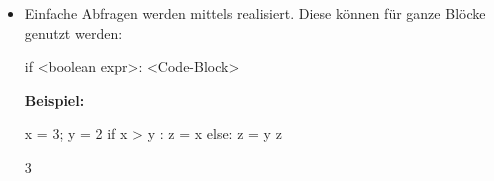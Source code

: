 \documentclass[fontsize=12pt,paper=a4,twoside,bibtotoc,idxtotoc,
liststotoc,pagesize,BCOR1.2cm,DIV15,chapterprefix,pagesize=pdftex]{scrbook}
\begin{document}
\begin{itemize}
\begin{sage}
(12, 16777216)
\end{sage}
\textbf{Wichtig:} In Python/Sage ist solch ein Code-Block dadurch gekennzeichnet, dass er mit einem \textbf{:} eingeleitet wird und um ein TAB eingerückt ist!
\item Einfache Abfragen werden mittels  realisiert. Diese können für ganze Blöcke genutzt werden:
\begin{sagein}
if <boolean expr>:
    <Code-Block>
\end{sagein}
\textbf{Beispiel:}
\begin{sagein}
x = 3; y = 2
if x > y :
    z = x
else:
    z = y
z
\end{sagein}
\begin{sage}
3
\end{sage}
\end{itemize}
\end{document}
